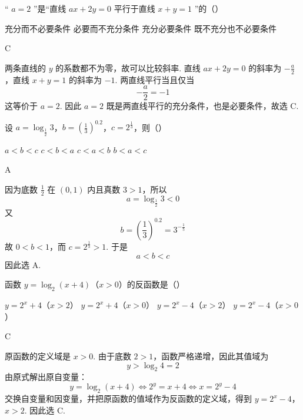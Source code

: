 \begin{problem}
“ \(a = 2\) ”是“直线 \(ax + 2y = 0\) 平行于直线 \(x + y = 1\) ”的（\quad）

\choices
    {充分而不必要条件}
    {必要而不充分条件}
    {充分必要条件}
    {既不充分也不必要条件}
\end{problem}

\begin{answer}
C
\end{answer}

\begin{solution}
两条直线的 \(y\) 的系数都不为零，故可以比较斜率. 直线 \(ax+2y=0\) 的斜率为 \(-\frac a2\)，直线 \(x+y=1\) 的斜率为 \(-1\). 两直线平行当且仅当
\[
-\frac a2=-1
\]
这等价于 \(a=2\). 因此 \(a=2\) 既是两直线平行的充分条件，也是必要条件，故选 C.
\end{solution}

\begin{problem}
设 \(a = \log_{\frac12} 3\)，\(b = \left(\frac{1}{3}\right)^{0.2}\)，\(c = 2^{\frac{1}{3}}\)，则（\quad）

\choices
    {\(a < b < c\)}
    {\(c < b < a\)}
    {\(c < a < b\)}
    {\(b < a < c\)}
\end{problem}

\begin{answer}
A
\end{answer}

\begin{solution}
因为底数 \(\frac12\) 在 \((0,1)\) 内且真数 \(3>1\)，所以
\[
a=\log_{\frac12}3<0
\]
又
\[
b=\left(\frac13\right)^{0.2}=3^{-\frac{1}{5}}
\]
故 \(0<b<1\)，而 \(c=2^{\frac{1}{3}}>1\). 于是
\[
a<b<c
\]
因此选 A.
\end{solution}

\begin{problem}
函数 \(y = \log_2(x + 4)\)（\(x > 0\)）的反函数是（\quad）

\choices
    {\(y = 2^{x} + 4\)（\(x > 2\)）}
    {\(y = 2^{x} + 4\)（\(x > 0\)）}
    {\(y = 2^{x} - 4\)（\(x > 2\)）}
    {\(y = 2^{x} - 4\)（\(x > 0\)）}
\end{problem}

\begin{answer}
C
\end{answer}

\begin{solution}
原函数的定义域是 \(x>0\). 由于底数 \(2>1\)，函数严格递增，因此其值域为
\[
y>\log_2 4=2
\]
由原式解出原自变量：
\[
y=\log_2(x+4)
\Longleftrightarrow 2^y=x+4
\Longleftrightarrow x=2^y-4
\]
交换自变量和因变量，并把原函数的值域作为反函数的定义域，得到
\(y=2^x-4\)，\(x>2\).
因此选 C.
\end{solution}

